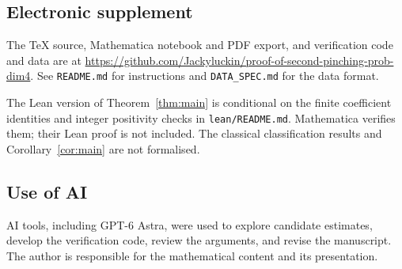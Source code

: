 \documentclass[11pt,a4paper]{amsart}
\numberwithin{equation}{section}
\theoremstyle{definition}
\theoremstyle{remark}
\begin{document}
\subsection*{Electronic supplement}
The TeX source, Mathematica notebook and PDF export, and verification
code and data are at
\url{https://github.com/Jackyluckin/proof-of-second-pinching-prob-dim4}.
See \texttt{README.md} for instructions and
\texttt{DATA\_SPEC.md} for the data format.

The Lean version of Theorem~\ref{thm:main} is conditional on the finite
coefficient identities and integer positivity checks in \texttt{lean/README.md}.
Mathematica verifies them; their Lean proof is not included.
The classical classification results and Corollary~\ref{cor:main}
are not formalised.

\subsection*{Use of AI}
AI tools, including GPT-6 Astra, were used to explore candidate estimates,
develop the verification code, review the arguments, and revise the
manuscript. The author is responsible for the mathematical content and
its presentation.
\end{document}
